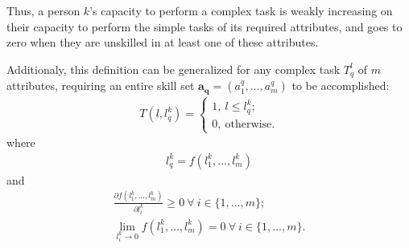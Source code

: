 {\begin{definition}
        Thus, a person $k$'s capacity to perform a complex task is weakly increasing on their capacity to perform the simple tasks of its required attributes, and goes to zero when they are unskilled in at least one of these attributes.

        Additionaly, this definition can be generalized for any complex task $T_{q}^{l}$ of $m$ attributes, requiring an entire skill set $\boldsymbol{a_q} = (a_{1}^{q}, \dots, a_{m}^{q})$ to be accomplished:
        \begin{gather}
            T(l, l_{q}^{k}) =
            \begin{cases}
                1, \ l \leq l_{q}^{k}; \\
                0, \ \text{otherwise.}
            \end{cases}
        \end{gather}
        where
        \begin{gather}
            l_{q}^{k} = f(l_{1}^{k}, \dots, l_{m}^{k})
        \end{gather}
        and 
        \begin{gather}
            \frac{
                \partial
                f(l_{1}^{k}, \dots, l_{m}^{k})
            }{
                \partial 
                l_{i}^{k}
            } \geq 0
            \
            \forall 
            \
            i \in \{1, \dots, m\}
            ;\\
            \lim_{
                l_{i}^{k} \rightarrow 0
            }{
                f(l_{1}^{k}, \dots, l_{m}^{k})
            } = 0
            \
            \forall 
            \
            i \in \{1, \dots, m\}
            .
        \end{gather}


\end{definition}}
